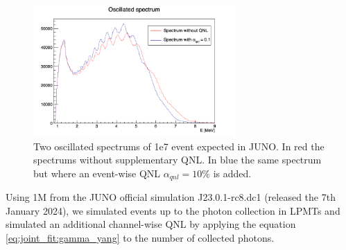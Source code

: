 \documentclass[../main.tex]{subfiles}
\begin{document}
\begin{figure}[ht]
  \centering
  \includegraphics[height=5cm]{images/joint_fit/spectrums.png}
  \caption{Two oscillated spectrums of 1e7 event expected in JUNO. In red the spectrums without supplementary QNL. In blue the same spectrum but where an event-wise QNL $\alpha_{qnl} = 10\%$ is added.}
  \label{fig:joint_fit:spectrums_comp}
\end{figure}


Using 1M from the JUNO official simulation J23.0.1-rc8.dc1 (released the 7th January 2024), we simulated events up to the photon collection in LPMTs and simulated an additional channel-wise QNL by applying the equation \ref{eq:joint_fit:gamma_yang} to the number of collected photons.
\end{document}
